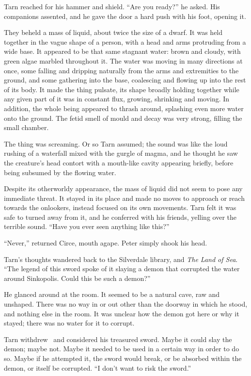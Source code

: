 Tarn reached for his hammer and shield.  ``Are you ready?'' he asked.  His companions assented, and he gave the door a hard push with his foot, opening it.

They beheld a mass of liquid, about twice the size of a dwarf.  It was held together in the vague shape of a person, with a head and arms protruding from a wide base.  It appeared to be that same stagnant water: brown and cloudy, with green algae marbled throughout it.  The water was moving in many directions at once, some falling and dripping naturally from the arms and extremities to the ground, and some gathering into the base, coalescing and flowing up into the rest of its body.  It made the thing pulsate, its shape broadly holding together while any given part of it was in constant flux, growing, shrinking and moving.  In addition, the whole being appeared to thrash around, splashing even more water onto the ground.  The fetid smell of mould and decay was very strong, filling the small chamber.

The thing was screaming.  Or so Tarn assumed; the sound was like the loud rushing of a waterfall mixed with the gurgle of magma, and he thought he saw the creature's head contort with a mouth-like cavity appearing briefly, before being subsumed by the flowing water.

Despite its otherworldy appearance, the mass of liquid did not seem to pose any immediate threat.  It stayed in its place and made no moves to approach or reach towards the onlookers, instead focused on its own movements.  Tarn felt it was safe to turned away from it, and he conferred with his friends, yelling over the terrible sound.  ``Have you ever seen anything like this?''

``Never,'' returned Circe, mouth agape.  Peter simply shook his head.

Tarn's thoughts wandered back to the Silverdale library, and \emph{The Land of Sea}.  ``The legend of this sword spoke of it slaying a demon that corrupted the water around Sinkopolis.  Could this be such a demon?''

He glanced around at the room.  It seemed to be a natural cave, raw and unshaped.  There was no way in or out other than the doorway in which he stood, and nothing else in the room.  It was unclear how the demon got here or why it stayed; there was no water for it to corrupt.

Tarn withdrew \kildir\ and considered his treasured sword.  Maybe it could slay the demon; maybe not.  Maybe it needed to be used in a certain way in order to do so.  Maybe if he attempted it, the sword would break, or be absorbed within the demon, or itself be corrupted. ``I don't want to risk the sword.''

